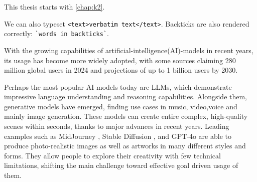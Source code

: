 \documentclass[
  a4paper,  %
  twoside,  %
  bibliography=totoc,
  headsepline,
  cleardoublepage=empty,
  parskip=half,
  draft=false
]{scrbook}
\begin{document}
This thesis starts with \cref{chap:k2}.

We can also typeset \verb|<text>verbatim text</text>|.
Backticks are also rendered correctly: \verb|`words in backticks`|.

With the growing capabilities of artificial-intelligence(AI)-models in recent years, its usage has become more widely adopted, with some sources claiming 280 million global users in 2024 \cite{AI-users} and projections of up to 1 billion users by 2030.



Perhaps the most popular AI models today are LLMs, which demonstrate impressive language understanding and reasoning capabilities. Alongside them, generative models have emerged, finding use cases in music, video,voice and mainly image generation. These models can create entire complex, high-quality scenes within seconds, thanks to major advances in recent years. Leading examples such as MidJourney \cite{midjourney}, Stable Diffusion \cite{stable-diffusion}, and GPT-4o \cite{GPT-4o} are able to produce photo-realistic images as well as artworks in many different styles and forms. They allow people to explore their creativity with few technical limitations, shifting the main challenge toward effective goal driven usage of them. 
\end{document}
